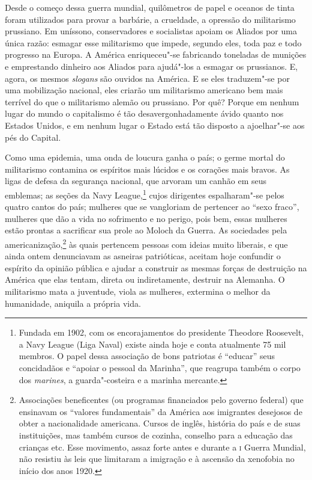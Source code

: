 Desde o começo dessa guerra mundial, quilômetros de papel e oceanos de
tinta foram utilizados para provar a barbárie, a crueldade, a opressão
do militarismo prussiano. Em uníssono, conservadores e socialistas
apoiam os Aliados por uma única razão: esmagar esse militarismo que
impede, segundo eles, toda paz e todo progresso na Europa. A América
enriqueceu"-se fabricando toneladas de munições e emprestando dinheiro
aos Aliados para ajudá"-los a esmagar os prussianos. E, agora, os
mesmos \textit{slogans} são ouvidos na América. E se eles traduzem"-se por uma
mobilização nacional, eles criarão um militarismo americano bem mais
terrível do que o militarismo alemão ou prussiano. Por quê? Porque em
nenhum lugar do mundo o capitalismo é tão desavergonhadamente ávido
quanto nos Estados Unidos, e em nenhum lugar o Estado está tão disposto
a ajoelhar"-se aos pés do Capital.

Como uma epidemia, uma onda de loucura ganha o país; o germe mortal do
militarismo contamina os espíritos mais lúcidos e os corações mais
bravos. As ligas de defesa da segurança nacional, que arvoram um canhão
em seus emblemas; as seções da Navy League,\footnote{ Fundada  
em 1902, com os encorajamentos do presidente Theodore Roosevelt, 
a Navy League (Liga Naval) existe ainda hoje e conta atualmente 75 mil membros. 
O papel dessa associação de bons patriotas é “educar” seus concidadãos e 
“apoiar o pessoal da Marinha”, que reagrupa também o corpo dos \textit{marines}, 
a guarda"-costeira e a marinha mercante.} cujos dirigentes
espalharam"-se pelos quatro cantos do país; mulheres que se vangloriam
de pertencer ao “sexo fraco”, mulheres que dão a vida no sofrimento e
no perigo, pois bem, essas mulheres estão prontas a sacrificar sua
prole ao Moloch da Guerra. As sociedades pela americanização,\footnote{ 
Associações beneficentes (ou programas
financiados pelo governo federal) que ensinavam os “valores fundamentais” da
América aos imigrantes desejosos de obter a nacionalidade americana.
Cursos de inglês, história do país e de suas instituições, mas também
cursos de cozinha, conselho para a educação das crianças etc. Esse
movimento, assaz forte antes e durante a \textsc{i} Guerra Mundial, não resistiu
às leis que limitaram a imigração e à ascensão da xenofobia no início dos
anos 1920.}
às quais pertencem pessoas com ideias muito liberais, e que ainda ontem
denunciavam as asneiras patrióticas, aceitam hoje confundir o espírito
da opinião pública e ajudar a construir as mesmas forças de destruição
na América que elas tentam, direta ou indiretamente, destruir na
Alemanha. O militarismo mata a juventude, viola as mulheres, extermina
o melhor da humanidade, aniquila a própria vida.


